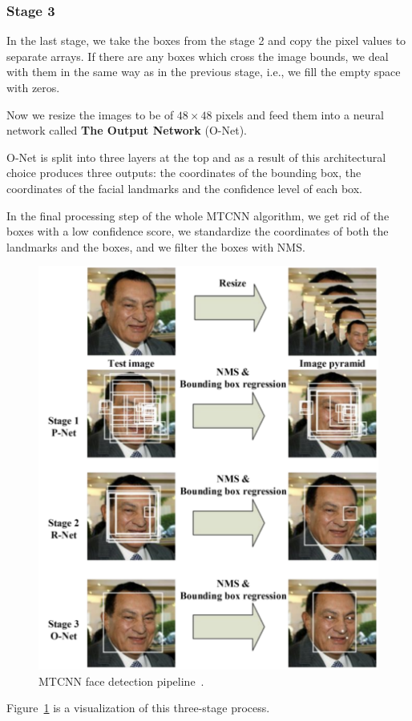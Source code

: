 \subsubsection{Stage 3}
In the last stage, we take the boxes from the stage 2 and copy the pixel values to separate arrays.
If there are any boxes which cross the image bounds, we deal with them in the same way as in the previous stage,
i.e., we fill the empty space with zeros.

Now we resize the images to be of $48 \times 48$ pixels and feed them into a neural network called
\textbf{The Output Network} (O-Net).

O-Net is split into three layers at the top and as a result of this architectural choice produces three outputs:
the coordinates of the bounding box, the coordinates of the facial landmarks and the confidence level of each box.

In the final processing step of the whole MTCNN algorithm, we get rid of the boxes with a low confidence score,
we standardize the coordinates of both the landmarks and the boxes, and  we filter the boxes with NMS.

\begin{figure}[H]
    \centering
    \includegraphics[width=0.7\columnwidth]{images/face-recognition/mtcnn.png}
    \caption{MTCNN face detection pipeline~\cite{MTCNN}.}
    \label{fig:mtcnn}
\end{figure}

Figure~\ref{fig:mtcnn} is a visualization of this three-stage process.